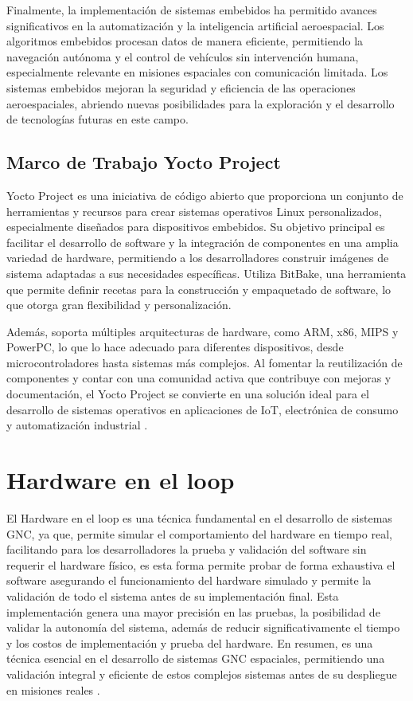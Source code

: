 Finalmente, la implementación de sistemas embebidos ha permitido avances significativos en la automatización y la inteligencia artificial aeroespacial. Los algoritmos embebidos procesan datos de manera eficiente, permitiendo la navegación autónoma y el control de vehículos sin intervención humana, especialmente relevante en misiones espaciales con comunicación limitada. Los sistemas embebidos mejoran la seguridad y eficiencia de las operaciones  aeroespaciales, abriendo nuevas posibilidades para la exploración y el desarrollo de tecnologías futuras en este campo. \cite{Falcoz2023GuidanceN}

\subsection{Marco de Trabajo Yocto Project}

Yocto Project es una iniciativa de código abierto que proporciona un conjunto de herramientas y recursos para crear sistemas operativos Linux personalizados, especialmente diseñados para dispositivos embebidos. Su objetivo principal es facilitar el desarrollo de software y la integración de componentes en una amplia variedad de hardware, permitiendo a los desarrolladores construir imágenes de sistema adaptadas a sus necesidades específicas. Utiliza BitBake, una herramienta que permite definir recetas para la construcción y empaquetado de software, lo que otorga gran flexibilidad y personalización. \cite{salvador2014embedded}

Además, soporta múltiples arquitecturas de hardware, como ARM, x86, MIPS y PowerPC, lo que lo hace adecuado para diferentes dispositivos, desde microcontroladores hasta sistemas más complejos. Al fomentar la reutilización de componentes y contar con una comunidad activa que contribuye con mejoras y documentación, el Yocto Project se convierte en una solución ideal para el desarrollo de sistemas operativos en aplicaciones de IoT, electrónica de consumo y automatización industrial \cite{vaduva2015learning}.

\section{Hardware en el loop}
El Hardware en el loop es una técnica fundamental en el desarrollo de sistemas GNC, ya que, permite simular el comportamiento del hardware en tiempo real, facilitando para los desarrolladores la prueba y validación del software sin requerir el hardware físico, es esta forma permite probar de forma exhaustiva el software asegurando el funcionamiento del hardware simulado y permite la validación de todo el sistema antes de su implementación final. Esta implementación genera una mayor precisión en las pruebas, la posibilidad de validar la autonomía del sistema, además de reducir significativamente el tiempo y los costos de implementación y prueba del hardware. En  resumen, es una técnica esencial en el desarrollo de sistemas GNC espaciales, permitiendo una validación integral y eficiente de estos complejos sistemas antes de su despliegue en misiones reales \cite{mihalivc2022hardware} \cite{montoya2020advanced}.




